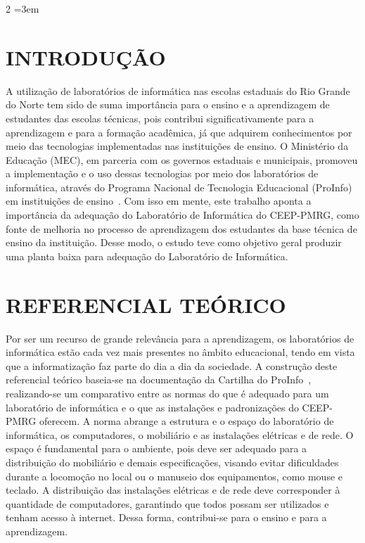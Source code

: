 \documentclass[a4paper,10pt]{article}
\begin{document}
\begin{minipage}{0.92\paperwidth}
\begin{multicols}{2}
\scriptsize
{}
\emergencystretch=3em
\section*{\centering INTRODUÇÃO}

A utilização de laboratórios de informática nas escolas estaduais do Rio Grande do Norte tem sido de suma importância para o ensino e a aprendizagem de estudantes das escolas técnicas, pois contribui significativamente para a aprendizagem e para a formação acadêmica, já que adquirem conhecimentos por meio das tecnologias implementadas nas instituições de ensino. O Ministério da Educação (MEC), em parceria com os governos estaduais e municipais, promoveu a implementação e o uso dessas tecnologias por meio dos laboratórios de informática, através do Programa Nacional de Tecnologia Educacional (ProInfo)~\cite{proinfo1997} em instituições de ensino~\cite{lobler2012renote}.
Com isso em mente, este trabalho aponta a importância da adequação do Laboratório de Informática do CEEP-PMRG, como fonte de melhoria no processo de aprendizagem dos estudantes da base técnica de ensino da instituição. Desse modo, o estudo teve como objetivo geral produzir uma planta baixa para adequação do Laboratório de Informática.
\section*{\centering REFERENCIAL TEÓRICO}

Por ser um recurso de grande relevância para a aprendizagem, os laboratórios de informática estão cada vez mais presentes no âmbito educacional, tendo em vista que a informatização faz parte do dia a dia da sociedade. A construção deste referencial teórico baseia-se na documentação da Cartilha do ProInfo~\citep{proinfo1997}, realizando-se um comparativo entre as normas do que é adequado para um laboratório de informática e o que as instalações e padronizações do CEEP-PMRG oferecem.
A norma abrange a estrutura e o espaço do laboratório de informática, os computadores, o mobiliário e as instalações elétricas e de rede. O espaço é fundamental para o ambiente, pois deve ser adequado para a distribuição do mobiliário e demais especificações, visando evitar dificuldades durante a locomoção no local ou o manuseio dos equipamentos, como mouse e teclado. A distribuição das instalações elétricas e de rede deve corresponder à quantidade de computadores, garantindo que todos possam ser utilizados e tenham acesso à internet. Dessa forma, contribui-se para o ensino e para a aprendizagem.

\end{multicols}
\end{minipage}
\end{document}
